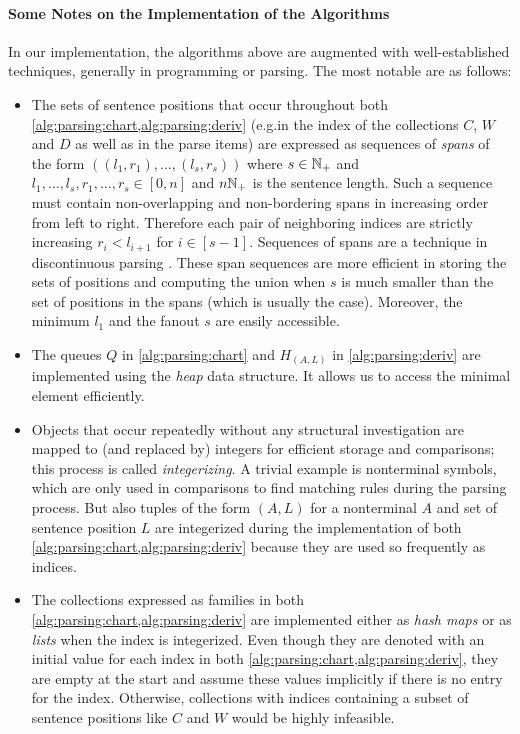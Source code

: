 \documentclass[../../document.tex]{subfiles}
\begin{document}
    \paragraph{Some Notes on the Implementation of the Algorithms}
    In our implementation, the algorithms above are augmented with well-established techniques, generally in programming or parsing.
    The most notable are as follows:
    \begin{itemize}
        \item The sets of sentence positions that occur throughout both \cref{alg:parsing:chart,alg:parsing:deriv} (e.g.\@ in the index of the collections \(C\), \(W\) and \(D\) as well as in the parse items) are expressed as sequences of \emph{spans} of the form \(((l_1, r_1), \ldots, (l_s, r_s))\) where \(s \in \mathbb{N}_+\) and \(l_1,\ldots,l_s,r_1,\ldots,r_s \in [0,n]\) and \(n \mathbb{N}_+\) is the sentence length.
            Such a sequence must contain non-overlapping and non-bordering spans in increasing order from left to right. Therefore each pair of neighboring indices are strictly increasing \(r_i < l_{i+1}\) for \(i \in [s-1]\).
            Sequences of spans are a technique in discontinuous parsing \citep[e.g.][cf.\@ range vector in def.\@ 6.6]{Kal10}.
            These span sequences are more efficient in storing the sets of positions and computing the union when \(s\) is much smaller than the set of positions in the spans (which is usually the case).
            Moreover, the minimum \(l_1\) and the fanout \(s\) are easily accessible.
        \item The queues \(Q\) in \cref{alg:parsing:chart} and \(H_{(A,L)}\) in \cref{alg:parsing:deriv} are implemented using the \emph{heap} data structure.
            It allows us to access the minimal element efficiently.
        \item Objects that occur repeatedly without any structural investigation are mapped to (and replaced by) integers for efficient storage and comparisons; this process is called \emph{integerizing}.
            A trivial example is nonterminal symbols, which are only used in comparisons to find matching rules during the parsing process.
            But also tuples of the form \((A, L)\) for a nonterminal \(A\) and set of sentence position \(L\) are integerized during the implementation of both \cref{alg:parsing:chart,alg:parsing:deriv} because they are used so frequently as indices.
        \item The collections expressed as families in both \cref{alg:parsing:chart,alg:parsing:deriv} are implemented either as \emph{hash maps} or as \emph{lists} when the index is integerized.
            Even though they are denoted with an initial value for each index in both \cref{alg:parsing:chart,alg:parsing:deriv}, they are empty at the start and assume these values implicitly if there is no entry for the index.
            Otherwise, collections with indices containing a subset of sentence positions like \(C\) and \(W\) would be highly infeasible.
    \end{itemize}
\end{document}
